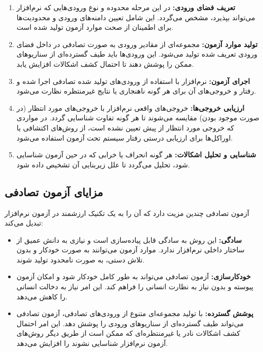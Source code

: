 \begin{enumerate}
	\item \textbf{تعریف فضای ورودی:} در این مرحله محدوده و نوع ورودی‌هایی که نرم‌افزار می‌تواند بپذیرد، مشخص می‌گردد. این شامل تعیین دامنه‌های ورودی و محدودیت‌ها برای اطمینان از صحت موارد آزمون تولید شده است.
	\item \textbf{تولید موارد آزمون:} مجموعه‌ای از مقادیر ورودی به صورت تصادفی در داخل فضای ورودی تعریف شده تولید می‌شود. این ورودی‌ها باید طیف گسترده‌ای از سناریوهای ممکن را پوشش دهند تا احتمال کشف اشکالات افزایش یابد.
	\item \textbf{اجرای آزمون:} نرم‌افزار با استفاده از ورودی‌های تولید شده تصادفی اجرا شده و رفتار و خروجی‌های آن برای هر گونه ناهنجاری یا نتایج غیرمنتظره نظارت می‌شود.
	\item \textbf{ارزیابی خروجی‌ها:} خروجی‌های واقعی نرم‌افزار با خروجی‌های مورد انتظار (در صورت موجود بودن) مقایسه می‌شوند تا هر گونه تفاوت شناسایی گردد. در مواردی که خروجی مورد انتظار از پیش تعیین نشده است، از روش‌های اکتشافی یا اوراکل‌ها
	 برای ارزیابی درستی رفتار سیستم تحت آزمون استفاده می‌شود.
	\item \textbf{شناسایی و تحلیل اشکالات:} هر گونه انحراف یا خرابی که در حین آزمون شناسایی شود، تحلیل می‌گردد تا علل زیربنایی آن تشخیص داده شود.
\end{enumerate}


\subsection{مزایای آزمون تصادفی}
آزمون تصادفی چندین مزیت دارد که آن را به یک تکنیک ارزشمند در آزمون نرم‌افزار تبدیل می‌کند:
\begin{itemize}
	\item \textbf{سادگی:} این روش به سادگی قابل پیاده‌سازی است و نیازی به دانش عمیق از ساختار داخلی نرم‌افزار ندارد. موارد آزمون می‌توانند به صورت خودکار و بدون تلاش دستی، به صورت نامحدود تولید شوند.
	\item \textbf{خودکارسازی:} آزمون تصادفی می‌تواند به طور کامل خودکار شود و امکان آزمون پیوسته و بدون نیاز به نظارت انسانی را فراهم کند. این امر نیاز به دخالت انسانی را کاهش می‌دهد.
	\item \textbf{پوشش گسترده:} با تولید مجموعه‌ای متنوع از ورودی‌های تصادفی، آزمون تصادفی می‌تواند طیف گسترده‌ای از سناریوهای ورودی را پوشش دهد. این امر احتمال کشف اشکالات نادر یا غیرمنتظره‌ای که ممکن است از طریق دیگر روش‌های آزمون نرم‌افزار شناسایی نشوند را افزایش می‌دهد.
\end{itemize}

